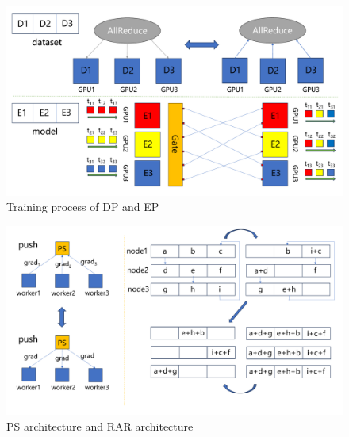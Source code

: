 \documentclass[conference]{IEEEtran}
\begin{document}
\begin{figure}
	\centering
	\includegraphics[width=1\linewidth]{figure/picture3}
	\caption{Training process of DP and EP}
	\label{fig:picture3}
\end{figure}

\begin{figure}
	\centering
	\includegraphics[width=1\linewidth]{figure/picture5}
	\caption{PS architecture and RAR architecture}
	\label{fig:picture5}
\end{figure}
\end{document}
